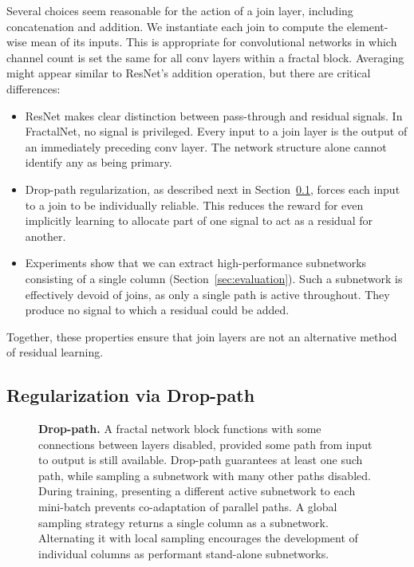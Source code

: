 \documentclass{article}
\newcommand{\fracnet}{FractalNet}
\newcommand{\resnet}{ResNet}
\newcommand{\Resnet}{ResNet}
\newcommand{\Droppath}{Drop-path}
\begin{document}
Several choices seem reasonable for the action of a $\mathrm{join}$ layer,
including concatenation and addition.  We instantiate each $\mathrm{join}$
to compute the element-wise mean of its inputs.  This is appropriate for
convolutional networks in which channel count is set the same for all
$\mathrm{conv}$ layers within a fractal block.  Averaging might appear similar
to {\resnet}'s addition operation, but there are critical differences:
\begin{itemize}
   \item{
      {\Resnet} makes clear distinction between pass-through and residual
      signals.  In {\fracnet}, no signal is privileged.  Every input to a
      $\mathrm{join}$ layer is the output of an immediately preceding
      $\mathrm{conv}$ layer.  The network structure alone cannot identify any
      as being primary.
   }
   \item{
      {\Droppath} regularization, as described next in
      Section~\ref{sec:droppath}, forces each input to a $\mathrm{join}$ to
      be individually reliable.  This reduces the reward for even implicitly
      learning to allocate part of one signal to act as a residual for
      another.
   }
   \item{
      Experiments show that we can extract high-performance subnetworks
      consisting of a single column (Section~\ref{sec:evaluation}).  Such a
      subnetwork is effectively devoid of joins, as only a single path is
      active throughout.  They produce no signal to which a residual could be
      added.
   }
\end{itemize}
Together, these properties ensure that $\mathrm{join}$ layers are not an
alternative method of residual learning.

\subsection{Regularization via {\Droppath}}
\label{sec:droppath}

\begin{figure}[t]
   \begin{center}
      
   \end{center}
   \vspace{-0.02\linewidth}
   \caption{
      \textbf{{\Droppath}.}
         A fractal network block functions with some connections between layers
         disabled, provided some path from input to output is still available.
         {\Droppath} guarantees at least one such path, while sampling a
         subnetwork with many other paths disabled.  During training,
         presenting a different active subnetwork to each mini-batch prevents
         co-adaptation of parallel paths.  A global sampling strategy
         returns a single column as a subnetwork.  Alternating it with local
         sampling encourages the development of individual columns as
         performant stand-alone subnetworks.
   }
   \label{fig:droppath}
\end{figure}
\end{document}
